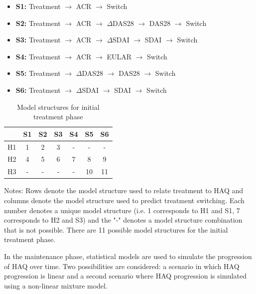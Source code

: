 \documentclass[11pt,final,fleqn]{article}\usepackage[]{graphicx}\usepackage[]{color}
\theoremstyle{plain}
\begin{document}
\begin{itemize}
\item \textbf{S1:} Treatment $\rightarrow$ ACR $\rightarrow$ Switch
\item \textbf{S2:} Treatment $\rightarrow$ ACR $\rightarrow$ $\Delta$DAS28 $\rightarrow$ DAS28 $\rightarrow$ Switch 
\item \textbf{S3:} Treatment $\rightarrow$ ACR $\rightarrow$ $\Delta$SDAI $\rightarrow$ SDAI $\rightarrow$ Switch 
\item \textbf{S4:} Treatment $\rightarrow$ ACR $\rightarrow$ EULAR $\rightarrow$ Switch
\item \textbf{S5:} Treatment $\rightarrow$ $\Delta$DAS28 $\rightarrow$ DAS28 $\rightarrow$ Switch 
\item \textbf{S6:} Treatment  $\rightarrow$ $\Delta$SDAI $\rightarrow$ SDAI $\rightarrow$ Switch 
\end{itemize}

\begin{table}[!ht]
\begin{center}
\begin{threeparttable}
\caption{Model structures for initial treatment phase} \label{tbl:initial-model-structure}
\begin{tabularx}{\textwidth}{@{\extracolsep{\fill}}lcccccc}
\hline
\multicolumn{1}{l}{} & \multicolumn{1}{c}{S1} & \multicolumn{1}{c}{S2} & \multicolumn{1}{c}{S3} & \multicolumn{1}{c}{S4} & \multicolumn{1}{c}{S5} & \multicolumn{1}{c}{S6} \\
\hline
H1 & 1 & 2 & 3 & - & - & - \\
H2 & 4 & 5 & 6 & 7 & 8 & 9 \\
H3 & - & - & - & - & 10 & 11\\
\hline
\end{tabularx}
\scriptsize
Notes: Rows denote the model structure used to relate treatment to HAQ and columns denote the model structure used to predict treatment switching. Each number denotes a unique model structure (i.e. 1 corresponds to H1 and S1, 7 corresponds to H2 and S3) and the "-" denotes a model structure combination that is not possible. There are 11 possible model structures for the initial treatment phase. 
\end{threeparttable}
\end{center}
\end{table}


In the maintenance phase, statistical models are used to simulate the progression of HAQ over time. Two possibilities are considered: a scenario in which HAQ progression is linear and a second scenario where HAQ progression is simulated using a non-linear mixture model.
\end{document}
